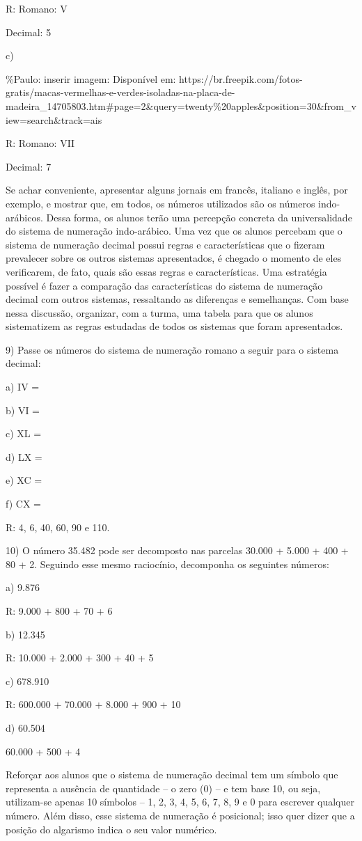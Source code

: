 R: Romano: V

Decimal: 5

c)

\%Paulo: inserir imagem: Disponível em:
https://br.freepik.com/fotos-gratis/macas-vermelhas-e-verdes-isoladas-na-placa-de-madeira\_14705803.htm\#page=2\&query=twenty\%20apples\&position=30\&from\_view=search\&track=ais

R: Romano: VII

Decimal: 7

Se achar conveniente, apresentar alguns jornais em francês, italiano e
inglês, por exemplo, e mostrar que, em todos, os números utilizados são
os números indo-arábicos. Dessa forma, os alunos terão uma percepção
concreta da universalidade do sistema de numeração indo-arábico. Uma vez
que os alunos percebam que o sistema de numeração decimal possui regras
e características que o fizeram prevalecer sobre os outros sistemas
apresentados, é chegado o momento de eles verificarem, de fato, quais
são essas regras e características. Uma estratégia possível é fazer a
comparação das características do sistema de numeração decimal com
outros sistemas, ressaltando as diferenças e semelhanças. Com base nessa
discussão, organizar, com a turma, uma tabela para que os alunos
sistematizem as regras estudadas de todos os sistemas que foram
apresentados.

9) Passe os números do sistema de numeração romano a seguir para o
sistema decimal:

a) IV =

b) VI =

c) XL =

d) LX =

e) XC =

f) CX =

R: 4, 6, 40, 60, 90 e 110.

10) O número 35.482 pode ser decomposto nas parcelas 30.000 + 5.000 +
400 + 80 + 2. Seguindo esse mesmo raciocínio, decomponha os seguintes
números:

a) 9.876

R: 9.000 + 800 + 70 + 6

b) 12.345

R: 10.000 + 2.000 + 300 + 40 + 5

c) 678.910

R: 600.000 + 70.000 + 8.000 + 900 + 10

d) 60.504

60.000 + 500 + 4

Reforçar aos alunos que o sistema de numeração decimal tem um símbolo
que representa a ausência de quantidade -- o zero (0) -- e tem base 10,
ou seja, utilizam-se apenas 10 símbolos -- 1, 2, 3, 4, 5, 6, 7, 8, 9 e 0
para escrever qualquer número. Além disso, esse sistema de numeração é
posicional; isso quer dizer que a posição do algarismo indica o seu
valor numérico.

